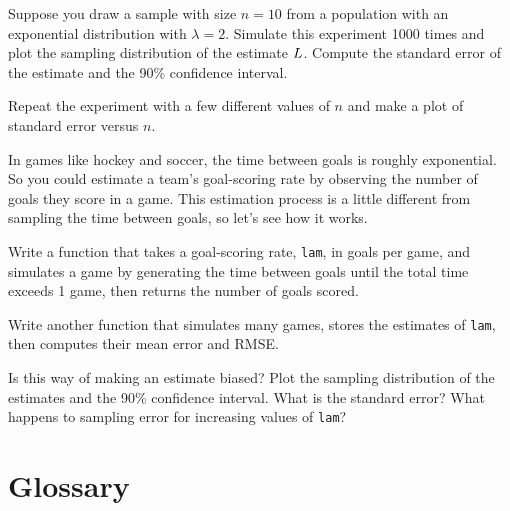 \documentclass[12pt]{book}
\begin{document}
\begin{exercise}

Suppose you draw a sample with size $n=10$ from a population 
with an exponential distribution with $\lambda=2$.  Simulate
this experiment 1000 times and plot the sampling distribution of
the estimate $L$.  Compute the standard error of the estimate
and the 90\% confidence interval.

Repeat the experiment with a few different values of $n$ and make
a plot of standard error versus $n$.

\end{exercise}


\begin{exercise}

In games like hockey and soccer, the time between goals is
roughly exponential.  So you could estimate a team's goal-scoring rate
by observing the number of goals they score in a game.  This
estimation process is a little different from sampling the time
between goals, so let's see how it works.

Write a function that takes a goal-scoring rate, {\tt lam}, in goals
per game, and simulates a game by generating the time between goals
until the total time exceeds 1 game, then returns the number of goals
scored.

Write another function that simulates many games, stores the
estimates of {\tt lam}, then computes their mean error and RMSE.

Is this way of making an estimate biased?  Plot the sampling
distribution of the estimates and the 90\% confidence interval.  What
is the standard error?  What happens to sampling error for increasing
values of {\tt lam}?

\end{exercise}


\section{Glossary}
\end{document}
